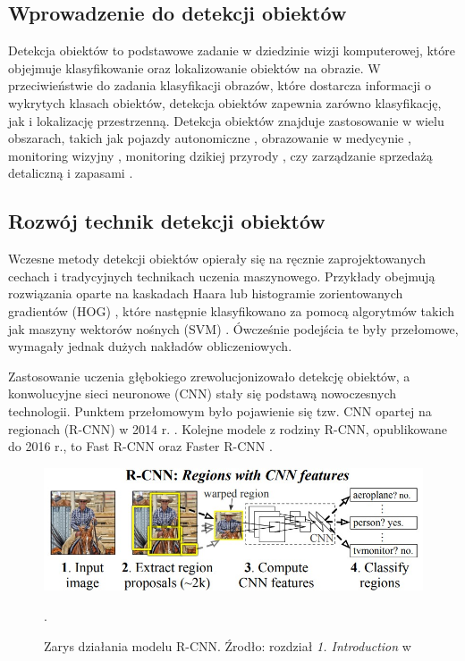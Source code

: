 \subsection{Wprowadzenie do detekcji obiektów}
Detekcja obiektów to podstawowe zadanie w dziedzinie wizji komputerowej, które objejmuje klasyfikowanie oraz lokalizowanie obiektów na obrazie. W przeciwieństwie do zadania klasyfikacji obrazów, które dostarcza informacji o wykrytych klasach obiektów, detekcja obiektów zapewnia zarówno klasyfikację, jak i lokalizację przestrzenną. Detekcja obiektów znajduje zastosowanie w wielu obszarach, takich jak pojazdy autonomiczne \cite{pojazdy_autonomiczne}, obrazowanie w medycynie \cite{obrazowanie_w_medycynie}, monitoring wizyjny \cite{monitoring_wizyjny}, monitoring dzikiej przyrody \cite{wildlife}, czy zarządzanie sprzedażą detaliczną i zapasami \cite{sklepy}.

\subsection{Rozwój technik detekcji obiektów}
Wczesne metody detekcji obiektów opierały się na ręcznie zaprojektowanych cechach i tradycyjnych technikach uczenia maszynowego. Przykłady obejmują rozwiązania oparte na kaskadach Haara \cite{haar} lub histogramie zorientowanych gradientów (HOG) \cite{hog}, które następnie klasyfikowano za pomocą algorytmów takich jak maszyny wektorów nośnych (SVM) \cite{svm}. Ówcześnie podejścia te były przełomowe, wymagały jednak dużych nakładów obliczeniowych.

Zastosowanie uczenia głębokiego zrewolucjonizowało detekcję obiektów, a konwolucyjne sieci neuronowe (CNN) stały się podstawą nowoczesnych technologii. Punktem przełomowym było pojawienie się tzw. CNN opartej na regionach (R-CNN) w 2014 r. \cite{RCNN}. Kolejne modele z rodziny R-CNN, opublikowane do 2016 r., to Fast R-CNN \cite{Fast-RCNN} oraz Faster R-CNN \cite{Faster-RCNN}.
\begin{figure}[H]
    \centering
    \includegraphics[width=\linewidth]{r_technologie/AI_assets/rcnn.png}
    \caption{Zarys działania modelu R-CNN. Źrodło: rozdział \emph{1. Introduction} w \cite{RCNN}}.
    \label{fig:R-CNN-schemat}
\end{figure}

